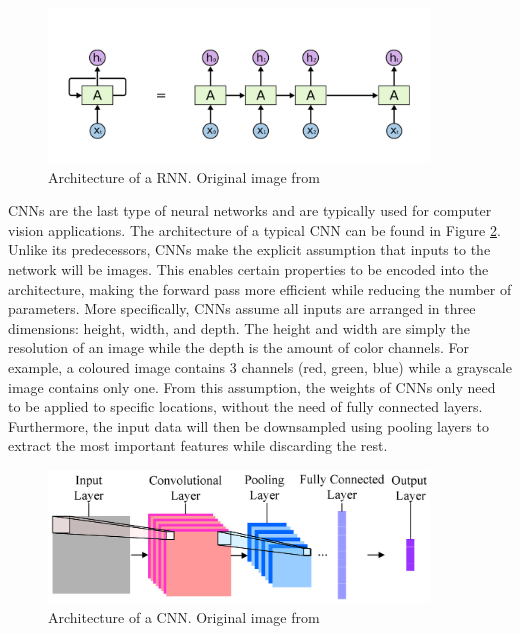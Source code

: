 \begin{figure}[h]
    \centering
    \includegraphics[width=0.9\textwidth]{images/ch2/02RNN.png}
    \caption{Architecture of a RNN.  Original image from \cite{NN}}
    \label{fig:02RNN}
\end{figure}

CNNs are the last type of neural networks and are typically used for computer vision applications. The architecture of a typical CNN can be found in Figure \ref{fig:02CNN}. Unlike its predecessors, CNNs make the explicit assumption that inputs to the network will be images. This enables certain properties to be encoded into the architecture, making the forward pass more efficient while reducing the number of parameters.  More specifically, CNNs assume all inputs are arranged in three dimensions: height, width, and depth.  The height and width are simply the resolution of an image while the depth is the amount of color channels.  For example, a coloured image contains 3 channels (red, green, blue) while a grayscale image contains only one.  From this assumption, the weights of CNNs only need to be applied to specific locations, without the need of fully connected layers.  Furthermore, the input data will then be downsampled using pooling layers to extract the most important features while discarding the rest.  

\begin{figure}[h]
    \centering
    \includegraphics[width=0.9\textwidth]{images/ch2/02CNN.png}
    \caption{Architecture of a CNN.  Original image from \cite{NN}}
    \label{fig:02CNN}
\end{figure}

